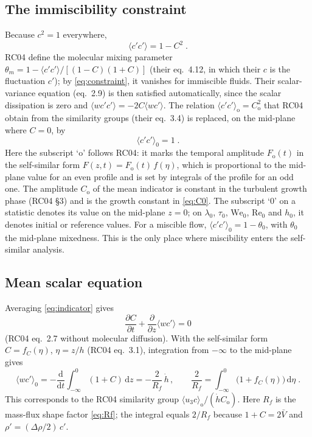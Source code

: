 \documentclass[11pt]{article}
\numberwithin{equation}{section}
\newcommand{\avg}[1]{\langle #1\rangle}
\newcommand{\We}{\mathrm{We}_0}
\newcommand{\hd}{\dot h}
\newcommand{\pd}[2]{\frac{\partial #1}{\partial #2}}
\begin{document}
\subsection{The immiscibility constraint}\label{sec:rc:constraint}
Because $c^2 = 1$ everywhere,
\begin{equation}\label{eq:constraint}
\avg{c' c'} = 1 - C^2 \;.
\end{equation}
RC04 define the molecular mixing parameter $\theta_m = 1 - \avg{c' c'}/[(1 - C)(1 + C)]$ (their eq.~4.12, in which their $c$ is the fluctuation $c'$); by \eqref{eq:constraint}, it vanishes for immiscible fluids. Their scalar-variance equation (eq.~2.9) is then satisfied automatically, since the scalar dissipation is zero and $\avg{w c' c'} = -2 C \avg{w c'}$. The relation $\avg{c' c'}_\mathrm{o} = C_\mathrm{o}^2$ that RC04 obtain from the similarity groups (their eq.~3.4) is replaced, on the mid-plane where $C = 0$, by
\begin{equation}\label{eq:cc0}
\avg{c' c'}_0 = 1 \;.
\end{equation}
Here the subscript `$\mathrm{o}$' follows RC04: it marks the temporal amplitude $F_\mathrm{o}(t)$ in the self-similar form $F(z, t) = F_\mathrm{o}(t) \, f(\eta)$, which is proportional to the mid-plane value for an even profile and is set by integrals of the profile for an odd one. The amplitude $C_\mathrm{o}$ of the mean indicator is constant in the turbulent growth phase (RC04 \S3) and is the growth constant in \eqref{eq:C0}. The subscript `$0$' on a statistic denotes its value on the mid-plane $z = 0$; on $\lambda_0$, $\tau_0$, $\We$, $\mathrm{Re}_0$ and $h_0$, it denotes initial or reference values. For a miscible flow, $\avg{c' c'}_0 = 1 - \theta_0$, with $\theta_0$ the mid-plane mixedness. This is the only place where miscibility enters the self-similar analysis.

\subsection{Mean scalar equation}\label{sec:rc:mean}
Averaging \eqref{eq:indicator} gives
\begin{equation}\label{eq:mean}
\pd{C}{t} + \pd{}{z} \avg{w c'} = 0
\end{equation}
(RC04 eq.~2.7 without molecular diffusion). With the self-similar form $C = f_C(\eta)$, $\eta = z/h$ (RC04 eq.~3.1), integration from $-\infty$ to the mid-plane gives
\begin{equation}\label{eq:flux_mean}
\avg{w c'}_0 = -\frac{\mathrm d}{\mathrm d t} \int_{-\infty}^0(1 + C) \, \mathrm d z = -\frac{2}{R_f} \, \hd \, , \qquad
\frac{2}{R_f} = \int_{-\infty}^0 \big(1 + f_C(\eta)\big) \, \mathrm d \eta \;.
\end{equation}
This corresponds to the RC04 similarity group $\avg{u_3 c}_\mathrm{o}/(\hd C_\mathrm{o})$. Here $R_f$ is the mass-flux shape factor \eqref{eq:Rf}; the integral equals $2/R_f$ because $1 + C = 2 \bar V$ and $\rho' = (\Delta \rho/2) \, c'$.
\end{document}
